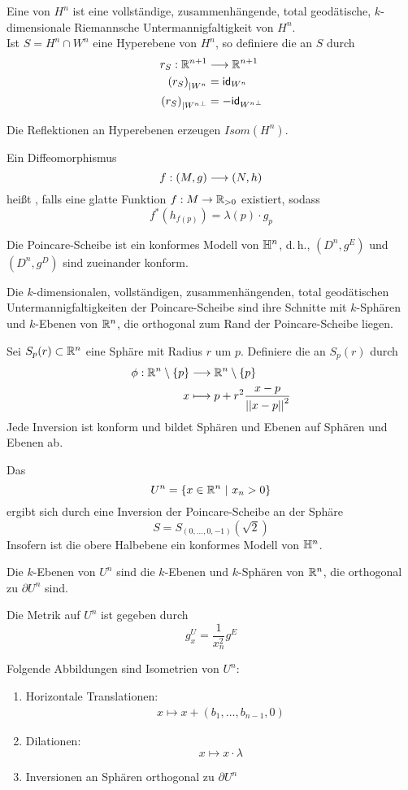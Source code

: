 \documentclass{book}
\begin{document}
\Def{}
Eine  von $H^n$ ist eine vollständige, zusammenhängende, total geodätische, $k$-dimensionale Riemannsche Untermannigfaltigkeit von $H^n$.\\
Ist $S = H^n\cap W^n$ eine Hyperebene von $H^n$, so definiere die  an $S$ durch
\begin{align*}
r_S : \mathbb{R}^{n+1} & \overset{}{\longrightarrow} \mathbb{R}^{n+1}\\
\left(r_S\right)_{|W^n} &= \textsf{id}_{W^n}\\
\left(r_S\right)_{|{W^n}^\bot} &= -\textsf{id}_{{W^n}^\bot}
\end{align*}

\Prop{}
Die Reflektionen an Hyperebenen erzeugen $Isom(H^n)$.

\Def{}
Ein Diffeomorphismus
\[ f : (M,g) \overset{}{\longrightarrow} (N,h) \] 
heißt , falls eine glatte Funktion $f : M \overset{}{\rightarrow} \mathbb{R}_{>0}$ existiert, sodass
\[ f^*(h_{f(p)}) = \lambda(p)\cdot g_p  \]

\Bem{}
Die Poincare-Scheibe ist ein konformes Modell von $\mathbb{H}^n$, d.\,h., $(D^n, g^E)$ und $(D^n, g^D)$ sind zueinander konform.

\Lem{}
Die $k$-dimensionalen, vollständigen, zusammenhängenden, total geodätischen Untermannigfaltigkeiten der Poincare-Scheibe sind ihre Schnitte mit $k$-Sphären und $k$-Ebenen von $\mathbb{R}^n$, die orthogonal zum Rand der Poincare-Scheibe liegen.

\Def{}
Sei $S_{p}(r) \subset \mathbb{R}^n$ eine Sphäre mit Radius $r$ um $p$. Definiere die  an $S_p(r)$ durch
\begin{align*}
\phi : \mathbb{R}^n\setminus\{p\} & \overset{}{\longrightarrow} \mathbb{R}^n\setminus\{p\}\\
x & \longmapsto p + r^2\frac{x- p}{\left|\left|x-p\right|\right|^2}
\end{align*}
\Prop{}
Jede Inversion ist konform und bildet Sphären und Ebenen auf Sphären und Ebenen ab.

\Def{}
Das 
\[ U^n = \set{x \in \R^{n}}{x_n > 0} \]
ergibt sich durch eine Inversion der Poincare-Scheibe an der Sphäre
\[ S = S_{(0,\ldots,0,-1)}(\sqrt{2}) \]
Insofern ist die obere Halbebene ein konformes Modell von $\mathbb{H}^n$.

\Prop{}
Die $k$-Ebenen von $U^n$ sind die $k$-Ebenen und $k$-Sphären von $\mathbb{R}^n$, die orthogonal zu $\partial U^n$ sind.

\Prop{}
Die Metrik auf $U^n$ ist gegeben durch
\[ g_x^U =  \frac{1}{x_n^2} g^E \]


\Prop{}
Folgende Abbildungen sind Isometrien von $U^n$:
\begin{enumerate}[1.)]
\item Horizontale Translationen:
\begin{align*}
x \longmapsto x + (b_1,\ldots, b_{n-1}, 0)
\end{align*}
\item Dilationen:
\[ x \longmapsto x \cdot \lambda \]
\item Inversionen an Sphären orthogonal zu $\partial U^n$
\end{enumerate}
\end{document}

